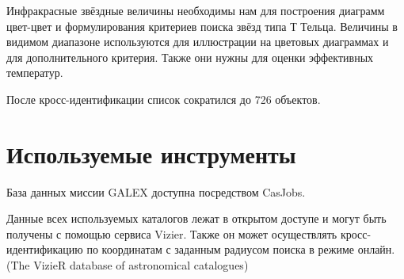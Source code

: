 Инфракрасные звёздные величины необходимы нам для построения диаграмм цвет-цвет и формулирования критериев поиска звёзд типа Т Тельца. Величины в видимом диапазоне используются для иллюстрации на цветовых диаграммах и для дополнительного критерия. Также они нужны для оценки эффективных температур.

После кросс-идентификации список сократился до 726 объектов. 

\section{Используемые инструменты}
База данных миссии GALEX доступна посредством CasJobs. 

Данные всех используемых каталогов лежат в открытом доступе и могут быть получены с помощью сервиса Vizier. Также он может осуществлять кросс-идентификацию по координатам с заданным радиусом поиска в режиме онлайн. (The VizieR database of astronomical catalogues)
